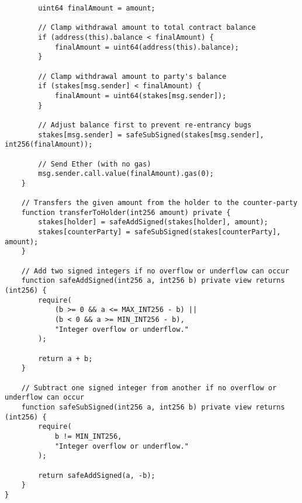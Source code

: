 \begin{lstlisting}
        uint64 finalAmount = amount;

        // Clamp withdrawal amount to total contract balance
        if (address(this).balance < finalAmount) {
            finalAmount = uint64(address(this).balance);
        }

        // Clamp withdrawal amount to party's balance
        if (stakes[msg.sender] < finalAmount) {
            finalAmount = uint64(stakes[msg.sender]);
        }

        // Adjust balance first to prevent re-entrancy bugs
        stakes[msg.sender] = safeSubSigned(stakes[msg.sender], int256(finalAmount));

        // Send Ether (with no gas)
        msg.sender.call.value(finalAmount).gas(0);
    }

    // Transfers the given amount from the holder to the counter-party
    function transferToHolder(int256 amount) private {
        stakes[holder] = safeAddSigned(stakes[holder], amount);
        stakes[counterParty] = safeSubSigned(stakes[counterParty], amount);
    }

    // Add two signed integers if no overflow or underflow can occur
    function safeAddSigned(int256 a, int256 b) private view returns (int256) {
        require(
            (b >= 0 && a <= MAX_INT256 - b) ||
            (b < 0 && a >= MIN_INT256 - b),
            "Integer overflow or underflow."
        );

        return a + b;
    }

    // Subtract one signed integer from another if no overflow or underflow can occur
    function safeSubSigned(int256 a, int256 b) private view returns (int256) {
        require(
            b != MIN_INT256,
            "Integer overflow or underflow."
        );

        return safeAddSigned(a, -b);
    }
}

\end{lstlisting}